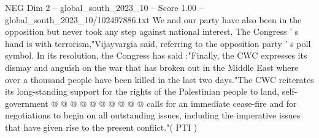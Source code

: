 \begin{textsample}{NEG Dim 2 – global\_south\_2023\_10 – Score 1.00 – global\_south\_2023\_10/102497886.txt}
We and our party have also been in the opposition but never took any step against national interest.
The Congress ' s hand is with terrorism,"Vijayvargia said, referring to the opposition party ' s poll symbol.
In its resolution, the Congress has said :"Finally, the CWC expresses its dismay and anguish on the war that has broken out in the Middle East where over a thousand people have been killed in the last two days."The CWC reiterates its long-standing support for the rights of the Palestinian people to land, self-government @ @ @ @ @ @ @ @ @ @ calls for an immediate cease-fire and for negotiations to begin on all outstanding issues, including the imperative issues that have given rise to the present conflict."( PTI )

\end{textsample}
